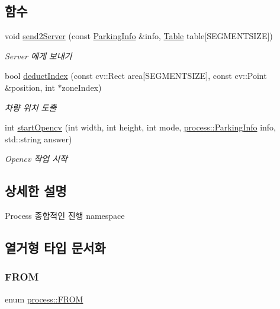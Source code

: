 \subsection*{함수}
\begin{DoxyCompactItemize}
\item 
void \hyperlink{namespaceprocess_a1f0aa45cb765ba7d279ac2c2199074ea}{send2\+Server} (const \hyperlink{structprocess_1_1_parking_info}{Parking\+Info} \&info, \hyperlink{structprocess_1_1_table}{Table} table\mbox{[}S\+E\+G\+M\+E\+N\+T\+S\+I\+ZE\mbox{]})
\begin{DoxyCompactList}\small\item\em Server 에게 보내기 \end{DoxyCompactList}\item 
bool \hyperlink{namespaceprocess_a774ab0220f8a28dd0175af9d93fa9dd0}{deduct\+Index} (const cv\+::\+Rect area\mbox{[}S\+E\+G\+M\+E\+N\+T\+S\+I\+ZE\mbox{]}, const cv\+::\+Point \&position, int $\ast$zone\+Index)
\begin{DoxyCompactList}\small\item\em 차량 위치 도출 \end{DoxyCompactList}\item 
int \hyperlink{namespaceprocess_a04e297268dc5195b3c29081e59cb411f}{start\+Opencv} (int width, int height, int mode, \hyperlink{structprocess_1_1_parking_info}{process\+::\+Parking\+Info} info, std\+::string answer)
\begin{DoxyCompactList}\small\item\em Opencv 작업 시작 \end{DoxyCompactList}\end{DoxyCompactItemize}


\subsection{상세한 설명}
Process 종합적인 진행 namespace 

\subsection{열거형 타입 문서화}
\mbox{\label{namespaceprocess_ac4191f2d90b44ca6a832f36481b403e7}} 
\subsubsection{\texorpdfstring{F\+R\+OM}{FROM}}
{\footnotesize\ttfamily enum \hyperlink{namespaceprocess_ac4191f2d90b44ca6a832f36481b403e7}{process\+::\+F\+R\+OM}}



